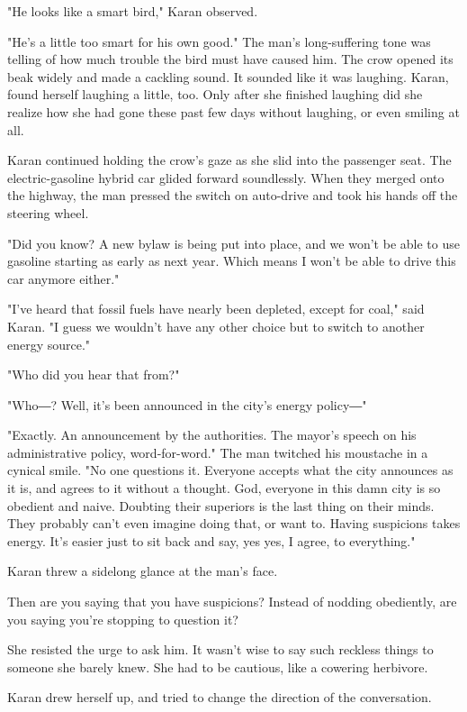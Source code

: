 "He looks like a smart bird," Karan observed.

"He's a little too smart for his own good." The man's long-suffering
tone was telling of how much trouble the bird must have caused him. The
crow opened its beak widely and made a cackling sound. It sounded like
it was laughing. Karan, found herself laughing a little, too. Only after
she finished laughing did she realize how she had gone these past few
days without laughing, or even smiling at all.

Karan continued holding the crow's gaze as she slid into the passenger
seat. The electric-gasoline hybrid car glided forward soundlessly. When
they merged onto the highway, the man pressed the switch on auto-drive
and took his hands off the steering wheel.

"Did you know? A new bylaw is being put into place, and we won't be able
to use gasoline starting as early as next year. Which means I won't be
able to drive this car anymore either."

"I've heard that fossil fuels have nearly been depleted, except for
coal," said Karan. "I guess we wouldn't have any other choice but to
switch to another energy source."

"Who did you hear that from?"

"Who―? Well, it's been announced in the city's energy policy―"

"Exactly. An announcement by the authorities. The mayor's speech on his
administrative policy, word-for-word." The man twitched his moustache in
a cynical smile. "No one questions it. Everyone accepts what the city
announces as it is, and agrees to it without a thought. God, everyone in
this damn city is so obedient and naive. Doubting their superiors is the
last thing on their minds. They probably can't even imagine doing that,
or want to. Having suspicions takes energy. It's easier just to sit back
and say, yes yes, I agree, to everything."

Karan threw a sidelong glance at the man's face.

Then are you saying that you have suspicions? Instead of nodding
obediently, are you saying you're stopping to question it?

She resisted the urge to ask him. It wasn't wise to say such reckless
things to someone she barely knew. She had to be cautious, like a
cowering herbivore.

Karan drew herself up, and tried to change the direction of the
conversation.


